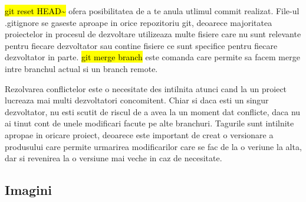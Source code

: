\hl{git reset HEAD\~} ofera posibilitatea de a te anula utlimul commit realizat. File-ul .gitignore se gaseste aproape in orice repozitoriu git, deoarece majoritatea proiectelor in procesul de dezvoltare utilizeaza multe fisiere care nu sunt relevante pentru fiecare dezvoltator sau contine fisiere ce sunt specifice pentru fiecare dezvoltator in parte. \hl{git merge branch} este comanda care permite sa facem merge intre branchul actual si un branch remote. 

Rezolvarea conflictelor este o necesitate des intilnita atunci cand la un proiect lucreaza mai multi dezvoltatori concomitent. Chiar si daca esti un singur dezvoltator, nu esti scutit de riscul de a avea la un moment dat conflicte, daca nu ai tinut cont de unele modificari facute pe alte branchuri. Tagurile sunt intilnite apropae in oricare proiect, deoarece este important de creat o versionare a produsului care permite urmarirea modificarilor care se fac de la o veriune la alta, dar si revenirea la o versiune mai veche in caz de necesitate.

\subsection{Imagini}

